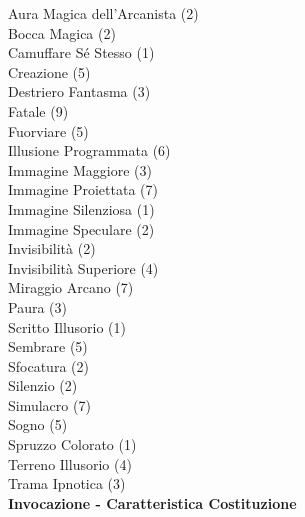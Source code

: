 \begin{multicols}{3}
{	
	Aura Magica dell'Arcanista (2)\\
	Bocca Magica (2)\\
	Camuffare Sé Stesso (1)\\
	Creazione (5)\\
	Destriero Fantasma (3)\\
	Fatale (9)\\
	Fuorviare (5)\\
	Illusione Programmata (6)\\
	Immagine Maggiore (3)\\
	Immagine Proiettata (7)\\
	Immagine Silenziosa (1)\\
	Immagine Speculare (2)\\
	Invisibilità (2)\\
	Invisibilità Superiore (4)\\
	Miraggio Arcano (7)\\
	Paura (3)\\
	Scritto Illusorio (1)\\
	Sembrare (5)\\
	Sfocatura (2)\\
	Silenzio (2)\\
	Simulacro (7)\\
	Sogno (5)\\
	Spruzzo Colorato (1)\\
	Terreno Illusorio (4)\\
	Trama Ipnotica (3)\\

	\medskip\textbf{Invocazione - Caratteristica Costituzione}

}
\end{multicols}
